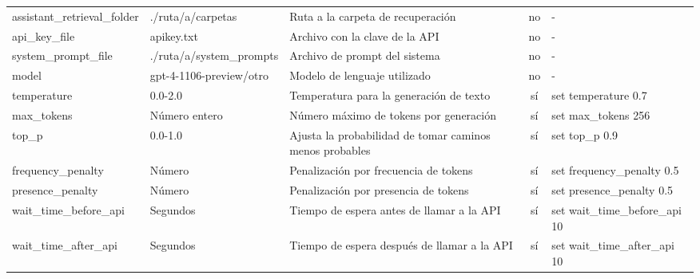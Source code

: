 \begin{landscape}
\begin{table}[htbp]
\begin{tabularx}{\linewidth}{lXlcl}
        assistant\_retrieval\_folder & \textcolor{pathcolor}{./ruta/a/carpetas} & Ruta a la carpeta de recuperación & no & - \\
        api\_key\_file & \textcolor{pathcolor}{apikey.txt} & Archivo con la clave de la API & no & - \\
        system\_prompt\_file & \textcolor{pathcolor}{./ruta/a/system\_prompts} & Archivo de prompt del sistema & no & - \\
        model & gpt-4-1106-preview/otro & Modelo de lenguaje utilizado & no & - \\
        temperature & \textcolor{numbercolor}{0.0-2.0} & Temperatura para la generación de texto & sí & set temperature \textcolor{numbercolor}{0.7} \\
        max\_tokens & \textcolor{numbercolor}{Número entero} & Número máximo de tokens por generación & sí & set max\_tokens \textcolor{numbercolor}{256} \\
        top\_p & \textcolor{numbercolor}{0.0-1.0} & Ajusta la probabilidad de tomar caminos menos probables & sí & set top\_p \textcolor{numbercolor}{0.9} \\
        frequency\_penalty & \textcolor{numbercolor}{Número} & Penalización por frecuencia de tokens & sí & set frequency\_penalty \textcolor{numbercolor}{0.5} \\
        presence\_penalty & \textcolor{numbercolor}{Número} & Penalización por presencia de tokens & sí & set presence\_penalty \textcolor{numbercolor}{0.5} \\
        wait\_time\_before\_api & \textcolor{numbercolor}{Segundos} & Tiempo de espera antes de llamar a la API & sí & set wait\_time\_before\_api \textcolor{numbercolor}{10} \\
        wait\_time\_after\_api & \textcolor{numbercolor}{Segundos} & Tiempo de espera después de llamar a la API & sí & set wait\_time\_after\_api \textcolor{numbercolor}{10} \\
        \bottomrule
    \end{tabularx}
    \endgroup
    \source{\propio}
    \label{table:json_comandos}
    \end{table}
\end{landscape}
    



